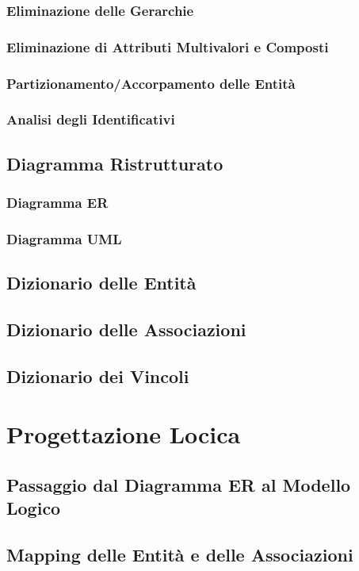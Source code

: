 \documentclass[a4paper,12pt,oneside]{book}
\begin{document}
\subsection{Eliminazione delle Gerarchie}

    \subsection{Eliminazione di Attributi Multivalori e Composti}
    \subsection{Partizionamento/Accorpamento delle Entità}
    \subsection{Analisi degli Identificativi}
    \section{Diagramma Ristrutturato}
    \subsection{Diagramma ER}
    \subsection{Diagramma UML}
    \section{Dizionario delle Entità}
    \section{Dizionario delle Associazioni}
    \section{Dizionario dei Vincoli}

    \chapter{Progettazione Locica}
    \section{Passaggio dal Diagramma ER al Modello Logico}
    \section{Mapping delle Entità e delle Associazioni}
\end{document}
